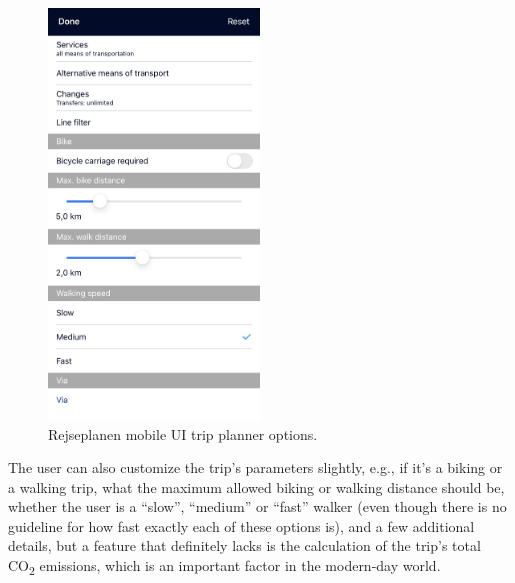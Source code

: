 \begin{figure}
    \centering
    \includegraphics[width=0.5\textwidth]{images/rejseplanen-options}
    \caption{Rejseplanen mobile UI trip planner options.}
    \label{fig:figure9}
\end{figure}

The user can also customize the trip's parameters slightly, e.g., if it's a biking or a walking trip, what the maximum
allowed biking or walking distance should be, whether the user is a ``slow'', ``medium'' or ``fast'' walker (even though
there is no guideline for how fast exactly each of these options is), and a few additional details, but a feature that
definitely lacks is the calculation of the trip’s total \unit{CO_{2}} emissions, which is an important factor in the
modern-day world.
